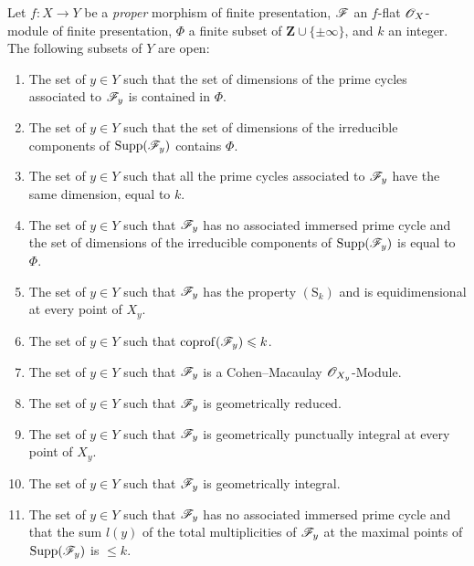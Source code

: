 \begin{theorem}[12.2.1]
\label{IV.12.2.1}
Let $f:X\to Y$ be a \emph{proper} morphism of finite presentation, $\mathscr{F}$ an $f$-flat $\mathscr{O}_X$-module of finite presentation, $\Phi$ a finite subset of $\mathbf{Z}\cup\{\pm\infty\}$, and $k$ an integer.
The following subsets of $Y$ are open:
\begin{enumerate}[label=(\roman*)]
  \item The set of $y\in Y$ such that the set of dimensions of the prime cycles associated to $\mathscr{F}_y$ is contained in $\Phi$.
  \item The set of $y\in Y$ such that the set of dimensions of the irreducible components of $\operatorname{Supp}(\mathscr{F}_y)$ contains $\Phi$.
  \item The set of $y\in Y$ such that all the prime cycles associated to $\mathscr{F}_y$ have the same dimension, equal to $k$.
  \item The set of $y\in Y$ such that $\mathscr{F}_y$ has no associated immersed prime cycle and the set of dimensions of the irreducible components of $\operatorname{Supp}(\mathscr{F}_y)$ is equal to $\Phi$.
  \item The set of $y\in Y$ such that $\mathscr{F}_y$ has the property $(\mathrm{S}_k)$ and is equidimensional at every point of $X_y$.
  \item The set of $y\in Y$ such that $\operatorname{coprof}(\mathscr{F}_y)\leqslant k$.
  \item The set of $y\in Y$ such that $\mathscr{F}_y$ is a Cohen--Macaulay $\mathscr{O}_{X_y}$-Module.
  \item The set of $y\in Y$ such that $\mathscr{F}_y$ is geometrically reduced.
  \item The set of $y\in Y$ such that $\mathscr{F}_y$ is geometrically punctually integral at every point of $X_y$.
  \item The set of $y\in Y$ such that $\mathscr{F}_y$ is geometrically integral.
  \item The set of $y\in Y$ such that $\mathscr{F}_y$ has no associated immersed prime cycle and that the sum $l(y)$ of the total multiplicities  of $\mathscr{F}_y$ at the maximal points of $\operatorname{Supp}(\mathscr{F}_y)$ is $\leqslant k$.
\end{enumerate}
\end{theorem}

